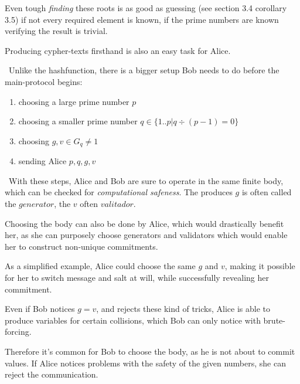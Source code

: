Even tough \textit{finding} these roots is as good as guessing (see \cite{b1} section 3.4 corollary 3.5) if not every required element is known, if the prime numbers are known verifying the result is trivial. 

Producing cypher-texts firsthand is also an easy task for Alice. 

~\newline Unlike the hashfunction, there is a bigger setup Bob needs to do before the main-protocol begins: 
	\begin{enumerate}
		\item choosing a large prime number $p$
		\item choosing a smaller prime number \newline $q \in \{1..p| q\div (p-1) = 0\}$
		\item choosing $g,v \in G_q \neq 1$
		\item sending Alice $p,q,g,v$ 
	\end{enumerate}
~\newline With these steps, Alice and Bob are sure to operate in the same finite body, which can be checked for \textit{computational safeness}. The produces $g$ is often called the $generator$, the $v$ often $valitador$.

Choosing the body can also be done by Alice, which would drastically benefit her, as she can purposely choose generators and validators which would enable her to construct non-unique commitments. 

As a simplified example, Alice could choose the same $g$ and $v$, making it possible for her to switch message and salt at will, while successfully revealing her commitment. 

Even if Bob notices $g=v$, and rejects these kind of tricks, Alice is able to produce variables for certain collisions, which Bob can only notice with brute-forcing. 

Therefore it's common for Bob to choose the body, as he is not about to commit values. If Alice notices problems with the safety of the given numbers, she can reject the communication.  

